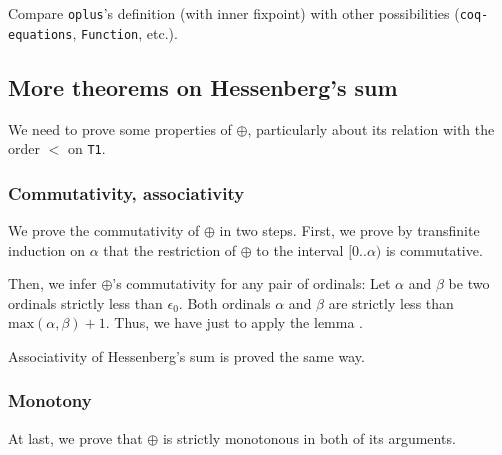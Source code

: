     \begin{project}
    Compare \texttt{oplus}'s definition (with inner fixpoint) with other possibilities
    (\texttt{coq-equations}, \texttt{Function}, etc.).
    \end{project}
    \subsection{More theorems on Hessenberg's sum}

    We need to prove some properties of $\oplus$, particularly about 
    its relation with the order $<$ on \texttt{T1}.

    \subsubsection{Commutativity, associativity}

    We prove  the commutativity of $\oplus$ in two steps. 
    First, we prove by transfinite induction on $\alpha$ that the restriction of $\oplus$ to the
    interval $[0..\alpha)$ is commutative.


    

    

    Then, we infer  $\oplus$'s commutativity for any pair of ordinals:
    Let $\alpha$ and $\beta$ be two ordinals strictly less than $\epsilon_0$. Both ordinals $\alpha$ and $\beta$ are
    strictly less than $\textrm{max}(\alpha,\beta)+1$.
        Thus, we have just to apply the lemma .


  

    Associativity of Hessenberg's sum is proved the same way.

    
    
    
    
 

    \subsubsection{Monotony}

    At last, we prove that $\oplus$ is strictly monotonous in both of its arguments.

    
    
